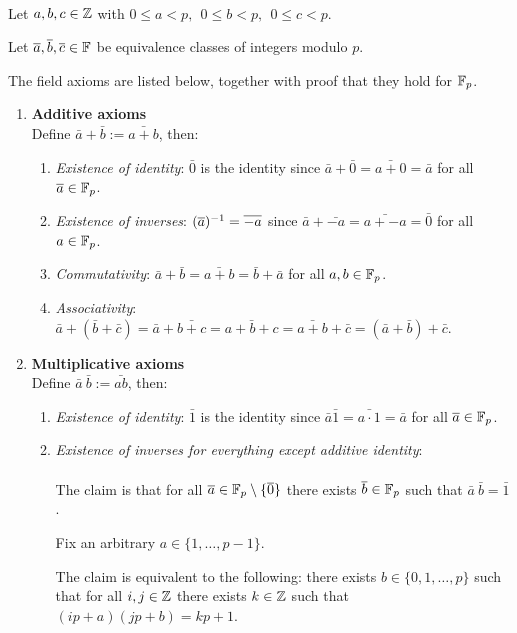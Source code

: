\documentclass[12pt]{article}
\begin{document}
\begin{mdframed}
  \\
  Let $a, b, c \in \mathbb{Z}$ with $0 \leq a < p, ~~ 0 \leq b < p, ~~ 0 \leq c < p$.

  Let $\overline a, \overline b, \overline c \in \mathbb{F}$ be equivalence classes of integers modulo $p$.

  The field axioms are listed below, together with proof that they hold for $\mathbb{F}_p$.
  \begin{enumerate}
  \item \textbf{Additive axioms}\\
    Define $\bar a + \bar b := \bar{a + b}$, then:
    \begin{enumerate}
    \item \textit{Existence of identity}: $\bar 0$ is the identity since
      $\bar a + \bar 0 = \bar{a + 0} = \bar{a}$ for all $\overline a \in \mathbb{F}_p$.
    \item \textit{Existence of inverses}: $(\overline a)^{-1} = \overline{-a}$ since
      $\bar a + \bar{-a} = \bar{a + -a} = \bar{0}$ for all $a \in \mathbb{F}_p$.
    \item \textit{Commutativity}:
      $\bar a + \bar b = \bar{a + b} = \bar{b} + \bar{a}$ for all $a, b \in \mathbb{F}_p$.
    \item \textit{Associativity}:
      $\bar a + (\bar b + \bar c) = \bar a + \bar {b + c} = \bar{a + b + c} =
      \bar{a + b} + \bar{c} = (\bar a + \bar b) + \bar{c}$.
    \end{enumerate}
  \item \textbf{Multiplicative axioms}\\
    Define $\bar a ~ \bar b := \bar{ab}$, then:
    \begin{enumerate}
    \item \textit{Existence of identity}: $\bar 1$ is the identity since
      $\bar a \bar 1 = \bar{a\cdot 1} = \bar{a}$ for all $\overline a \in \mathbb{F}_p$.
      \newpage
    \item \textit{Existence of inverses for everything except additive identity}:\\\\
      The claim is that for all $\overline a \in \mathbb{F}_p \setminus \{\overline 0\}$ there
      exists $\overline b \in \mathbb{F}_p$ such that $\bar a ~ \bar b = \bar 1$.

      Fix an arbitrary $a \in \{1, \ldots, p-1\}$.

      The claim is equivalent to the following: there exists
      $b \in \{0, 1, \ldots, p\}$ such that for all $i, j \in \mathbb{Z}$ there exists
      $k \in \mathbb{Z}$ such that $(ip + a)(jp + b) = kp + 1$.


\end{enumerate}
\end{enumerate}
\end{mdframed}
\end{document}
